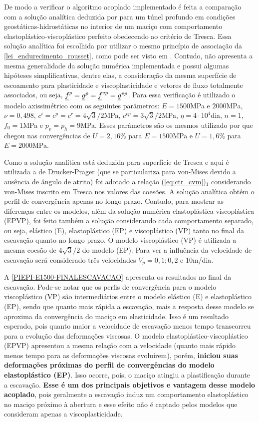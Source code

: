 De modo a verificar o algoritmo acoplado implementado é feita a comparação com a solução analítica deduzida por  para um túnel profundo em condições geostáticas-hidrostáticas no interior de um maciço com comportamento elastoplástico-viscoplástico perfeito obedecendo ao critério de Tresca. Essa solução analítica foi escolhida por utilizar o mesmo princípio de associação da \autoref{lei_endurecimento_rousset}, como pode ser visto em . Contudo, não apresenta a mesma generalidade da solução numérica implementada e possui algumas hipóteses simplificativas, dentre elas, a consideração da mesma superfície de escoamento para plasticidade e viscoplasticidade e vetores de fluxo totalmente associados, ou seja, $\underline f^p = \underline{g}^{p} = \underline f^{vp} = \underline{g}^{vp}$. Para essa verificação é utilizado o modelo axissimétrico com os seguintes parâmetros: $E=1500$MPa e $2000$MPa, $\nu=0,498$, $c^i=c^p=c^r =4\sqrt{3}/2$MPa, $c^{vp}=3\sqrt{3}/2$MPa, $\eta = 4 \cdot 10^4$dia, $n=1$, $f_0=1$MPa e $p_v=p_h=9$MPa. Esses parâmetros são os mesmos utilizado por  que chegou nas convergências de $U=2,16$\% para $E=1500$MPa e $U=1,6$\% para $E=2000$MPa.

Como a solução analítica está deduzida para superfície de Tresca e aqui é utilizada a de Drucker-Prager (que se particulariza para von-Mises devido a ausência de ângulo de atrito) foi adotado a relação (\ref{eq:ctr_cvm})$_1$ considerando von-Mises inscrito em Tresca nos valores das coesões. A solução analítica obtém o perfil de convergência apenas no longo prazo. Contudo, para mostrar as diferenças entre os modelos, além da solução numérica elastoplástica-viscoplástica (EPVP), foi feito também a solução considerando cada comportamento separado, ou seja, elástico (E), elastoplástico (EP) e viscoplástico (VP) tanto no final da escavação quanto no longo prazo. O modelo viscoplástico (VP) é utilizada a mesma coesão de $4\sqrt{3}/2$ do modelo (EP). Para ver a influência da velocidade de escavação será considerado três velocidades $V_p=0,1; 0,2$ e 10m/dia.

A \autoref{PIEPI-E1500-FINALESCAVACAO} apresenta os resultados no final da escavação. Pode-se notar que os perfis de convergência para o modelo viscoplástico (VP) são intermediários entre o modelo elástico (E) e elastoplástico (EP), sendo que quanto mais rápida a escavação, mais a resposta desse modelo se  aproxima da convergência do maciço em elasticidade. Isso é um resultado esperado, pois quanto maior a velocidade de escavação menos tempo transcorreu para a evolução das deformações viscosas. O modelo elastoplástico-viscoplástico (EPVP) apresentou a mesma relação com a velocidade (quanto mais rápido menos tempo para as deformações viscosas evoluírem), porém, \textbf{iniciou suas deformações próximas do perfil de convergências do modelo elastoplástico (EP)}. Isso ocorre, pois, o maciço atingiu a plastificação durante a escavação. \textbf{Esse é um dos principais objetivos e vantagem desse modelo acoplado}, pois geralmente a escavação induz um comportamento elastoplástico no maciço próximo à abertura e esse efeito não é captado pelos modelos que consideram apenas a viscoplasticidade.

